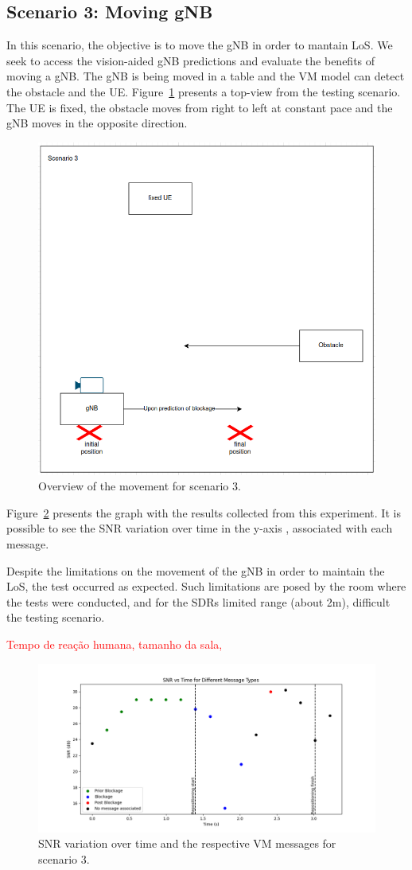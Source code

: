 \subsection{Scenario 3: Moving gNB}\label{subsec:scenario-3:-moving-gnb}

In this scenario, the objective is to move the gNB in order to mantain LoS\@.
We seek to access the vision-aided gNB predictions and evaluate the benefits of moving a gNB\@.
The gNB is being moved in a table and the VM model can detect the obstacle and the UE\@.
Figure~\ref{fig:test_movgnb} presents a top-view from the testing scenario.
The UE  is fixed, the obstacle moves from right to left at constant pace and the gNB moves in the opposite direction.

\begin{figure}[H]
    \centering
    \includegraphics[width=0.5\linewidth]{figures/scenario3}
    \caption{Overview of the movement for scenario 3.}
    \label{fig:test_movgnb}
\end{figure}

Figure~\ref{fig:results_3} presents the graph with the results collected from this experiment.
It is possible to see the SNR variation over time in the y-axis , associated with each message.

Despite the limitations on the movement of the gNB in order to maintain the LoS, the test occurred as expected.
Such limitations are posed by the room where the tests were conducted, and for the SDRs limited range (about 2m), difficult the testing scenario.

\textcolor{red}{Tempo de reação humana, tamanho da sala, }


\begin{figure}[H]
    \centering
    \includegraphics[width=\linewidth]{figures/results_3}
    \caption{SNR variation over time and the respective VM messages for scenario 3.}
    \label{fig:results_3}
\end{figure}

